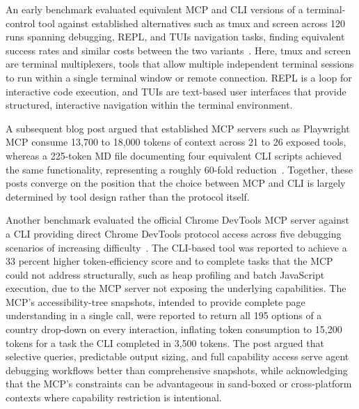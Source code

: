 \documentclass[
english,                 %
bibtex,                  %
includeExtraAbstracts, %
]{kththesis}
\numberwithin{listing}{chapter}
\begin{document}
An early benchmark evaluated equivalent \gls{MCP} and \gls{CLI} versions of a terminal-control tool against established alternatives such as tmux and screen across 120 runs spanning debugging, \gls{REPL}, and \glspl{TUI} navigation tasks, finding equivalent success rates and similar costs between the two variants~\cite{zechner_mcp_2025}. Here, tmux and screen are terminal multiplexers, tools that allow multiple independent terminal sessions to run within a single terminal window or remote connection. \gls{REPL} is a loop for interactive code execution, and \glspl{TUI} are text-based user interfaces that provide structured, interactive navigation within the terminal environment. 

A subsequent blog post argued that established \gls{MCP} servers such as Playwright \gls{MCP} consume 13,700 to 18,000 tokens of context across 21 to 26 exposed tools, whereas a 225-token \gls{MD} file documenting four equivalent \gls{CLI} scripts achieved the same functionality, representing a roughly 60-fold reduction~\cite{zechner_what_2025}. Together, these posts converge on the position that the choice between \gls{MCP} and \gls{CLI} is largely determined by tool design rather than the protocol itself.

Another benchmark evaluated the official Chrome \glspl{DevTool} \gls{MCP} server against a \gls{CLI} providing direct Chrome \glspl{DevTool} protocol access across five debugging scenarios of increasing difficulty~\cite{kumak_mcp_2025}. The \gls{CLI}-based tool was reported to achieve a 33 percent higher token-efficiency score and to complete tasks that the \gls{MCP} could not address structurally, such as heap profiling and batch JavaScript execution, due to the \gls{MCP} server not exposing the underlying capabilities. The \gls{MCP}'s accessibility-tree snapshots, intended to provide complete page understanding in a single call, were reported to return all 195 options of a country drop-down on every interaction, inflating token consumption to 15,200 tokens for a task the \gls{CLI} completed in 3,500 tokens. The post argued that selective queries, predictable output sizing, and full capability access serve agent debugging workflows better than comprehensive snapshots, while acknowledging that the \gls{MCP}'s constraints can be advantageous in sand-boxed or cross-platform contexts where capability restriction is intentional.
\end{document}
